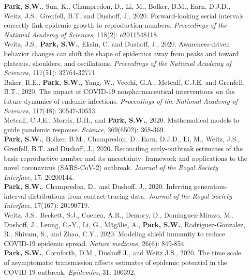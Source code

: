 \documentclass[11pt]{article} %
\begin{document}
 \textbf{Park, S.W.}, Sun, K., Champredon, D., Li, M., Bolker, B.M., Earn, D.J.D., Weitz, J.S., Grenfell, B.T. and Dushoff, J., 2020. Forward-looking serial intervals correctly link epidemic growth to reproduction numbers. \textit{Proceedings of the National Academy of Sciences}, 118(2): e2011548118.\\

 Weitz, J.S., \textbf{Park, S.W.}, Eksin, C. and Dushoff, J., 2020. Awareness-driven behavior changes can shift the shape of epidemics away from peaks and toward plateaus, shoulders, and oscillations. \textit{Proceedings of the National Academy of Sciences}, 117(51): 32764-32771.\\

 Baker, R.E., \textbf{Park, S.W.}, Yang, W., Vecchi, G.A., Metcalf, C.J.E. and Grenfell, B.T., 2020. The impact of COVID-19 nonpharmaceutical interventions on the future dynamics of endemic infections. \textit{Proceedings of the National Academy of Sciences}, 117(48): 30547-30553.\\

 Metcalf, C.J.E., Morris, D.H., and \textbf{Park, S.W.}, 2020. Mathematical models to guide pandemic response. \textit{Science}, 369(6502): 368-369.\\

 \textbf{Park, S.W.}, Bolker, B.M., Champredon, D., Earn, D.J.D., Li, M., Weitz, J.S., Grenfell, B.T. and Dushoff, J., 2020. Reconciling early-outbreak estimates of the basic reproductive number and its uncertainty: framework and applications to the novel coronavirus (SARS-CoV-2) outbreak. \textit{Journal of the Royal Society Interface}, 17: 20200144.\\

 \textbf{Park, S.W.}, Champredon, D., and Dushoff, J., 2020. Inferring generation-interval distributions from contact-tracing data. \textit{Journal of the Royal Society Interface}, 17(167): 20190719.\\

 Weitz, J.S., Beckett, S.J., Coenen, A.R., Demory, D., Dominguez-Mirazo, M., Dushoff, J., Leung, C.-Y., Li, G., Măgălie, A., \textbf{Park, S.W.}, Rodriguez-Gonzalez, R., Shivam, S., and Zhao, C.Y., 2020. Modeling shield immunity to reduce COVID-19 epidemic spread. \textit{Nature medicine}, 26(6): 849-854.\\

 \textbf{Park, S.W.}, Cornforth, D.M., Dushoff J., and Weitz J.S., 2020. The time scale of asymptomatic transmission affects estimates of epidemic potential in the COVID-19 outbreak. \textit{Epidemics}, 31: 100392.\\
\end{document}
